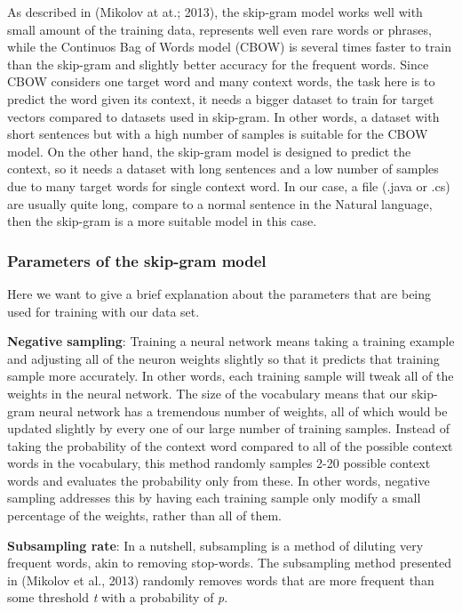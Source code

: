 As described in (Mikolov at at.; 2013)\cite{mikolov2013distributed}, the skip-gram model works well with small amount of the training data, represents well even rare words or phrases, while the Continuos Bag of Words model (CBOW) is several times faster to train than the skip-gram and slightly better accuracy for the frequent words. Since CBOW considers one target word and many context words, the task here is to predict the word given its context, it needs a bigger dataset to train for target vectors compared to datasets used in skip-gram. In other words, a dataset with short sentences but with a high number of samples is suitable for the CBOW model. On the other hand, the skip-gram model is designed to predict the context, so it needs a dataset with long sentences and a low number of samples due to many target words for single context word. In our case, a file (.java or .cs) are usually quite long, compare to a normal sentence in the Natural language, then the skip-gram is a more suitable model in this case. 


\subsubsection{ Parameters of the skip-gram model}
Here we want to give a brief explanation about the parameters that are being used for training with our data set.

\textbf{Negative sampling}: Training a neural network means taking a training example and adjusting all of the neuron weights slightly so that it predicts that training sample more accurately. In other words, each training sample will tweak all of the weights in the neural network. The size of the vocabulary means that our skip-gram neural network has a tremendous number of weights, all of which would be updated slightly by every one of our large number of training samples. Instead of taking the probability of the context word compared to all of the possible context words in the vocabulary, this method randomly samples 2-20 possible context words and evaluates the probability only from these. In other words, negative sampling addresses this by having each training sample only modify a small percentage of the weights, rather than all of them.

\textbf{Subsampling rate}: In a nutshell, subsampling is a method of diluting very frequent words, akin to removing stop-words. The subsampling method presented in (Mikolov et al., 2013) \cite{mikolov2013distributed} randomly removes words that are more frequent than some threshold \textit{t} with a probability of \textit{p}.

